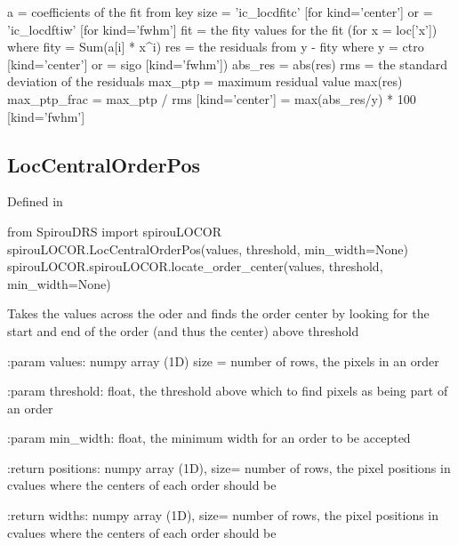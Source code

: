 \begin{minipage}{\textwidth}
\begin{pythondocstring}
        a = coefficients of the fit from key
        size = 'ic_locdfitc' [for kind='center'] or
             = 'ic_locdftiw' [for kind='fwhm']
        fit = the fity values for the fit (for x = loc['x'])
            where fity = Sum(a[i] * x^i)
        res = the residuals from y - fity
             where y = ctro [kind='center'] or 
                     = sigo [kind='fwhm'])
        abs_res = abs(res)
        rms = the standard deviation of the residuals
        max_ptp = maximum residual value max(res)
        max_ptp_frac = max_ptp / rms  [kind='center']
                     = max(abs_res/y) * 100   [kind='fwhm']
\end{pythondocstring}
\end{minipage}

\noindent\begin{minipage}{\textwidth}
\subsection{LocCentralOrderPos}

Defined in \spirouLOCOR{}

\begin{pythonbox}
from SpirouDRS import spirouLOCOR
spirouLOCOR.LocCentralOrderPos(values, threshold, min_width=None)
spirouLOCOR.spirouLOCOR.locate_order_center(values, threshold, min_width=None)
\end{pythonbox}

\begin{pythondocstring}
Takes the values across the oder and finds the order center by looking for
the start and end of the order (and thus the center) above threshold

:param values: numpy array (1D) size = number of rows, the pixels in an
                order

:param threshold: float, the threshold above which to find pixels as being
                  part of an order

:param min_width: float, the minimum width for an order to be accepted

:return positions: numpy array (1D), size= number of rows,
                   the pixel positions in cvalues where the centers of each
                   order should be

:return widths:    numpy array (1D), size= number of rows,
                   the pixel positions in cvalues where the centers of each
                   order should be
\end{pythondocstring}
\end{minipage}

